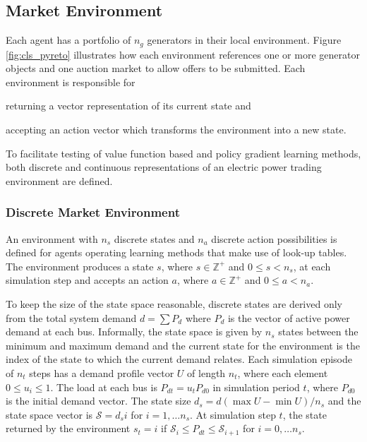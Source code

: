 \subsection{Market Environment}
Each agent has a portfolio of $n_g$ generators in their local environment.
Figure \ref{fig:cls_pyreto} illustrates how each environment
references one or more generator objects and one auction market to allow
offers to be submitted. Each environment is responsible for
\begin{inparaenum}[(i)]
\item returning a vector representation of its current state and \item accepting an action vector which
transforms the environment into a new state. \end{inparaenum}  To facilitate
testing of value function based and policy gradient learning methods, both
discrete and continuous representations of an electric power trading environment
are defined.


\subsubsection{Discrete Market Environment}
An environment with $n_s$ discrete states and $n_a$ discrete action
possibilities is defined for agents operating learning methods that make use of
look-up tables. The environment produces a state $s$, where $s \in \mathbb{Z}^+$
and $0\leq s < n_s$, at each simulation step and accepts an action $a$, where $a
\in \mathbb{Z}^+$ and $0\leq a < n_a$.

To keep the size of the state space reasonable, discrete states are derived only
from the total system demand $d=\sum P_d$ where $P_d$ is the vector of active
power demand at each bus.  Informally, the state space is given by $n_s$ states
between the minimum and maximum demand and the current state for the environment
is the index of the state to which the current demand relates.  Each simulation
episode of $n_t$ steps has a demand profile vector $U$ of length $n_t$, where
each element $0 \leq u_i \leq 1$. The load at each bus is $P_{dt} = u_tP_{d0}$
in simulation period $t$, where $P_{d0}$ is the initial demand vector.  The
state size $d_s = d(\max U - \min U)/n_s$ and the state space vector is
$\mathscr{S}=d_si$ for $i=1,\dotsc n_s$. At simulation step $t$, the state
returned by the environment $s_t = i$ if $\mathscr{S}_i \leq P_{dt} \leq
\mathscr{S}_{i+1}$ for $i = 0,\dotsc n_s$.


